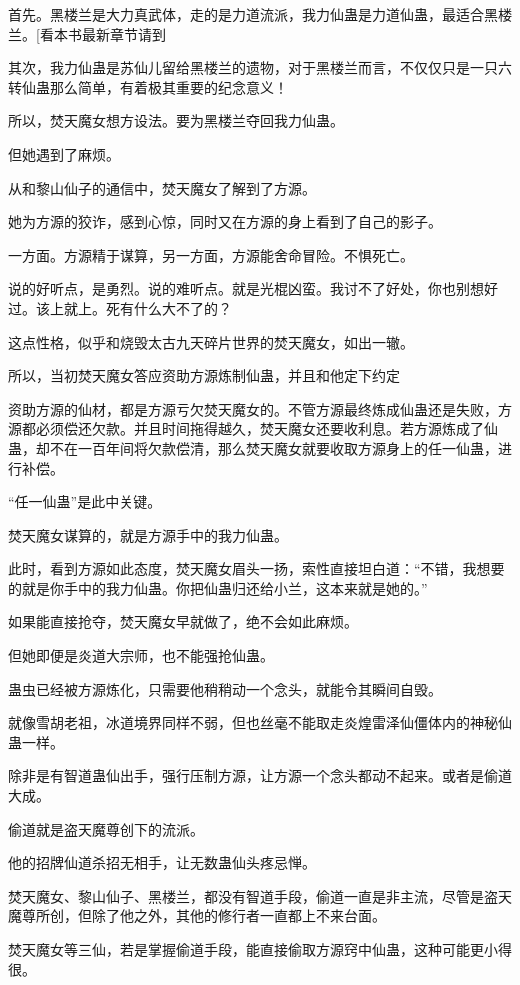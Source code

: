 \begin{this_body}
首先。黑楼兰是大力真武体，走的是力道流派，我力仙蛊是力道仙蛊，最适合黑楼兰。[看本书最新章节请到

其次，我力仙蛊是苏仙儿留给黑楼兰的遗物，对于黑楼兰而言，不仅仅只是一只六转仙蛊那么简单，有着极其重要的纪念意义！

所以，焚天魔女想方设法。要为黑楼兰夺回我力仙蛊。

但她遇到了麻烦。

从和黎山仙子的通信中，焚天魔女了解到了方源。

她为方源的狡诈，感到心惊，同时又在方源的身上看到了自己的影子。

一方面。方源精于谋算，另一方面，方源能舍命冒险。不惧死亡。

说的好听点，是勇烈。说的难听点。就是光棍凶蛮。我讨不了好处，你也别想好过。该上就上。死有什么大不了的？

这点性格，似乎和烧毁太古九天碎片世界的焚天魔女，如出一辙。

所以，当初焚天魔女答应资助方源炼制仙蛊，并且和他定下约定

资助方源的仙材，都是方源亏欠焚天魔女的。不管方源最终炼成仙蛊还是失败，方源都必须偿还欠款。并且时间拖得越久，焚天魔女还要收利息。若方源炼成了仙蛊，却不在一百年间将欠款偿清，那么焚天魔女就要收取方源身上的任一仙蛊，进行补偿。

“任一仙蛊”是此中关键。

焚天魔女谋算的，就是方源手中的我力仙蛊。

此时，看到方源如此态度，焚天魔女眉头一扬，索性直接坦白道：“不错，我想要的就是你手中的我力仙蛊。你把仙蛊归还给小兰，这本来就是她的。”

如果能直接抢夺，焚天魔女早就做了，绝不会如此麻烦。

但她即便是炎道大宗师，也不能强抢仙蛊。

蛊虫已经被方源炼化，只需要他稍稍动一个念头，就能令其瞬间自毁。

就像雪胡老祖，冰道境界同样不弱，但也丝毫不能取走炎煌雷泽仙僵体内的神秘仙蛊一样。

除非是有智道蛊仙出手，强行压制方源，让方源一个念头都动不起来。或者是偷道大成。

偷道就是盗天魔尊创下的流派。

他的招牌仙道杀招无相手，让无数蛊仙头疼忌惮。

焚天魔女、黎山仙子、黑楼兰，都没有智道手段，偷道一直是非主流，尽管是盗天魔尊所创，但除了他之外，其他的修行者一直都上不来台面。

焚天魔女等三仙，若是掌握偷道手段，能直接偷取方源窍中仙蛊，这种可能更小得很。


\end{this_body}
